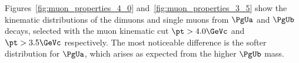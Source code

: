 

Figures~\ref{fig:muon_properties_4_0} and~\ref{fig:muon_properties_3_5} show the kinematic distributions of the dimuons and single muons from $\PgUa$ and $\PgUb$ decays, selected with the muon kinematic cut $\pt > 4.0\GeVc$ and $\pt > 3.5\GeVc$ respectively.
The most noticeable difference is the softer \pt distribution for $\PgUa$, which arises as expected from the higher $\PgUb$ mass. 

